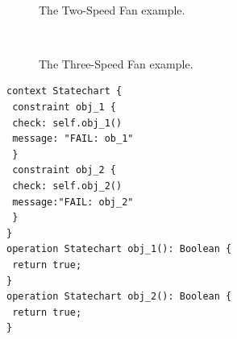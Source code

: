 \documentclass[12pt, a4paper]{report} \usepackage[titletoc]{appendix}
\begin{document}
\begin{figure}[t!]
 \centering
 \\
	\caption{The Two-Speed Fan example.}
 \label{example-02}
\end{figure}

\begin{figure}[t!]
 \centering
 \\
	\caption{The Three-Speed Fan example.}
 \label{example-03}
\end{figure}


\begin{lstlisting}[style=interfaces,caption={Validation template for objectives in One-Speed Fan activity/level.},label=validation-template]
context Statechart {
 constraint obj_1 {
 check: self.obj_1()
 message: "FAIL: ob_1"
 }
 constraint obj_2 {
 check: self.obj_2()
 message:"FAIL: obj_2"
 }
}
operation Statechart obj_1(): Boolean {
 return true;
}
operation Statechart obj_2(): Boolean {
 return true;
}
\end{lstlisting} 
\end{document}
